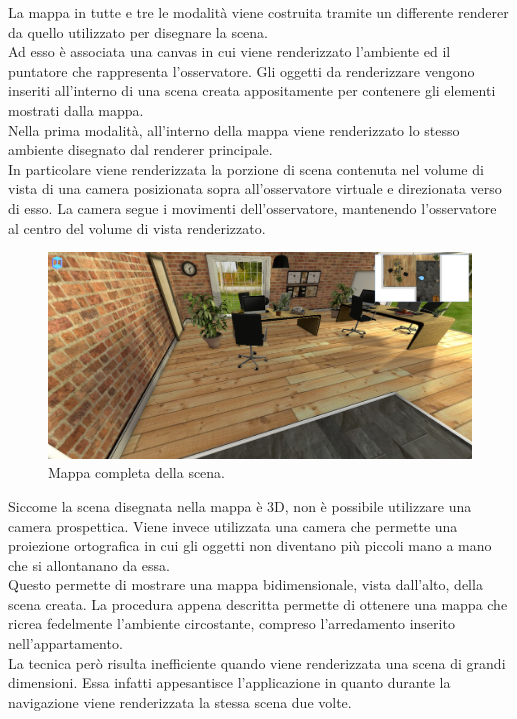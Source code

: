 La mappa in tutte e tre le modalità viene costruita tramite un differente renderer da quello utilizzato per disegnare la scena. 
\\
Ad esso è associata una canvas in cui viene renderizzato l’ambiente ed il puntatore che rappresenta l’osservatore. Gli oggetti da renderizzare vengono inseriti all’interno di una scena creata appositamente per contenere gli elementi mostrati dalla mappa.
\\
Nella prima modalità, all’interno della mappa viene renderizzato lo stesso ambiente disegnato dal renderer principale.
\\
In particolare viene renderizzata la porzione di scena contenuta nel volume di vista di una camera posizionata sopra all’osservatore virtuale e direzionata verso di esso.
La camera segue i movimenti dell’osservatore, mantenendo l’osservatore al centro del volume di vista renderizzato.
\begin{figure}[htb]
 \centering
 \includegraphics[width=1\linewidth]{images/chapter_navigazione_scena/map_3d.png}\hfill
 \caption[Mappa completa della scena.]{Mappa completa della scena.}
 \label{fig:navigazione_scena_map_3d}
\end{figure}
Siccome la scena disegnata nella mappa è 3D, non è possibile utilizzare una camera prospettica. Viene invece utilizzata una camera che permette una proiezione ortografica in cui gli oggetti non diventano più piccoli mano a mano che si allontanano da essa.
\\
Questo permette di mostrare una mappa bidimensionale, vista dall’alto, della scena creata.
La procedura appena descritta permette di ottenere una mappa che ricrea fedelmente l’ambiente circostante, compreso l’arredamento inserito nell’appartamento.
\\
La tecnica però risulta inefficiente quando viene renderizzata una scena di grandi dimensioni. Essa infatti appesantisce l’applicazione in quanto durante la navigazione viene renderizzata la stessa scena due volte.
